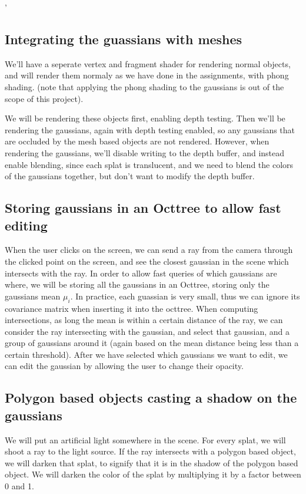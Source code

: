 \documentclass {article}
\begin{document}
                    '

\subsection{Integrating the guassians with meshes}
We'll have a seperate vertex and fragment shader for rendering normal objects, and will render them normaly as we have done in the assignments, with phong shading. (note that applying the phong shading to the gaussians is out of the scope of this project). 

We will be rendering these objects first, enabling depth testing. Then we'll be rendering the gaussians, again with depth testing enabled, so any gaussians that are occluded by the mesh based objects are not rendered. However, when rendering the gaussians, we'll disable writing to the depth buffer, and instead enable blending, since each splat is translucent, and we need to blend the colors of the gaussians together, but don't want to modify the depth buffer. 


\subsection{Storing gaussians in an Octtree to allow fast editing}

When the user clicks on the screen, we can send a ray from the camera through the clicked point on the screen, and see the closest gaussian in the scene which intersects with the ray. In order to allow fast queries of which gaussians are where, we will be storing all the gaussians in an Octtree, storing only the gaussians mean $\mu_i$. In practice, each guassian is very small, thus we can ignore its covariance matrix when inserting it into the octtree. When computing intersections, as long the mean is within a certain distance of the ray, we can consider the ray intersecting with the gaussian, and select that gaussian, and a group of gaussians around it (again based on the mean distance being less than a certain threshold).  After we have selected which gaussians we want to edit, we can edit the gaussian by allowing the user to change their opacity. 


\subsection{Polygon based objects casting a shadow on the gaussians}

We will put an artificial light somewhere in the scene. For every splat, we will shoot a ray to the light source. If the ray intersects with a polygon based object, we will darken that splat, to signify that it is in the shadow of the polygon based object. We will darken the color of the splat by multiplying it by a factor between 0 and 1.
\end{document}

